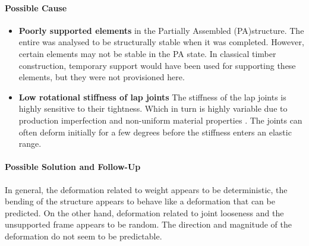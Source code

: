 \FloatBarrier

\paragraph{Possible Cause}

\begin{itemize}
    \item \textbf{Poorly supported elements} in the Partially Assembled (PA)structure. The entire was analysed to be structurally stable when it was completed. However, certain elements may not be stable in the PA state. In classical timber construction, temporary support would have been used for supporting these elements, but they were not provisioned here.
    \item \textbf{Low rotational stiffness of lap joints} The stiffness of the lap joints is highly sensitive to their tightness. Which in turn is highly variable due to production imperfection and non-uniform material properties \parencite{qinRotationalBehaviorColumn2018}. The joints can often deform initially for a few degrees before the stiffness enters an elastic range.
\end{itemize}

\paragraph{Possible Solution and Follow-Up}

In general, the deformation related to weight appears to be deterministic, the bending of the structure appears to behave like a deformation that can be predicted. On the other hand, deformation related to joint looseness and the unsupported frame appears to be random. The direction and magnitude of the deformation do not seem to be predictable.

